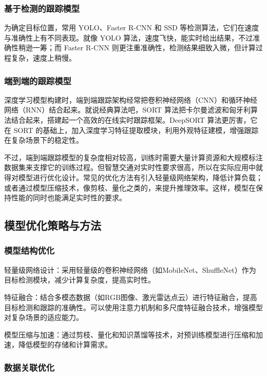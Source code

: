 \subsubsection{基于检测的跟踪模型}

为确定目标位置，常用 YOLO、Faster R-CNN 和 SSD 等检测算法，它们在速度与准确性上有不同表现。就像 YOLO 算法，速度飞快，能实时给出结果，不过准确性稍逊一筹；而 Faster R-CNN 则更注重准确性，检测结果细致入微，但计算过程复杂，速度上稍慢。


\subsubsection{端到端的跟踪模型}


深度学习模型构建时，端到端跟踪架构经常把卷积神经网络（CNN）和循环神经网络（RNN）结合起来。就说经典算法吧，SORT 算法把卡尔曼滤波和匈牙利算法结合起来，搭建起一个高效的在线实时跟踪框架。DeepSORT 算法更厉害，它在 SORT 的基础上，加入深度学习特征提取模块，利用外观特征建模，增强跟踪在复杂场景下的稳定性。

不过，端到端跟踪模型的复杂度相对较高，训练时需要大量计算资源和大规模标注数据集来支撑它的训练过程。但智慧交通对实时性要求很高，所以在实际应用中就得对模型进行优化设计。常见的优化方法有引入轻量级网络架构，降低计算负载；或者通过模型压缩技术，像剪枝、量化之类的，来提升推理效率。这样，模型在保持性能的同时也能满足实时性的要求。
\subsection{模型优化策略与方法}

\subsubsection{模型结构优化}

轻量级网络设计：采用轻量级的卷积神经网络（如MobileNet、ShuffleNet）作为目标检测模块，减少计算复杂度，提高实时性。

特征融合：结合多模态数据（如RGB图像、激光雷达点云）进行特征融合，提高目标检测和跟踪的准确性。可以使用注意力机制和多尺度特征融合技术，增强模型对复杂场景的适应能力。

模型压缩与加速：通过剪枝、量化和知识蒸馏等技术，对预训练模型进行压缩和加速，降低模型的存储和计算需求。

\subsubsection{数据关联优化}

